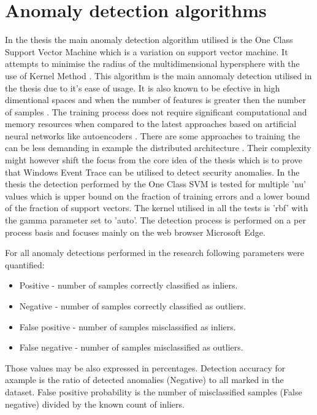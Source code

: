 \documentclass[a4paper,twoside,12pt]{book}
\begin{document}
\section{Anomaly detection algorithms}
In the thesis the main anomaly detection algorithm utilised is the One Class Support 
Vector Machine which is a variation on support vector machine. It attempts to minimise 
the radius of the multidimensional hypersphere with the use of Kernel Method \cite{bib:ocsvm}. 
This algorithm is the main annomaly detection utilised in the thesis due to it's ease of
usage. It is also known to be efective in high dimentional spaces and when 
the number of features is greater then the number of samples \cite{bib:svms}. The training process 
does not require significant computational and memory resources when compared to the latest
approaches based on artificial neural networks like autoencoders \cite{bib:autoencoder}. There are
some approaches to training the can be less demanding in example the distributed architecture
\cite{bib:autoencoderDist}. Their complexity might however shift the focus from the core idea 
of the thesis which is to prove that Windows Event Trace can be utilised to detect security
anomalies. In the thesis the detection performed by the One Class SVM is tested for multiple 'nu'
values which is upper bound on the fraction of training errors and a lower bound of the 
fraction of support vectors\cite{bib:skocsvm}. The kernel utilised in all the tests is 'rbf' with
the gamma parameter set to 'auto'. The detection process is performed 
on a per process basis and focuses mainly on the web browser Microsoft Edge. 

For all anomaly detections performed in the research following parameters were quantified:
\begin{itemize}
	\item Positive - number of samples correctly classified as inliers.
	\item Negative - number of samples correctly classified as outliers.
	\item False positive - number of samples misclassified as inliers. 
	\item False negative - number of samples misclassified as outliers.
\end{itemize}

Those values may be also expressed in percentages. Detection accuracy for axample is the ratio
of detected anomalies (Negative) to all marked in the dataset. False positive probability is 
the number of misclassified samples (False negative) divided by the known count of inliers.  
\end{document}
